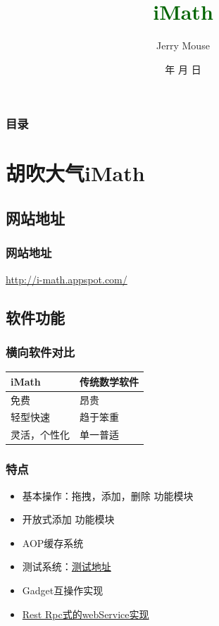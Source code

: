 \documentclass[dvipdfm,serif,mathserif]{beamer}
\renewcommand{\today}{\number\year 年 \number\month 月 \number\day 日}
\begin{document}
\title{   \textcolor{darkgreen}{\textbf{iMath}}}
\date{\today}
\author{Jerry Mouse}

\begin{frame}
\framesubtitle{}
  \titlepage
\end{frame}

\begin{frame}\frametitle{目录}
\tableofcontents

\end{frame}



\section{胡吹大气iMath}

\subsection{网站地址}
\begin{frame}
  \frametitle{网站地址}
\begin{LARGE}\href{http://i-math.appspot.com/}{\color{blue}http://i-math.appspot.com/}
\end{LARGE}\end{frame}

\subsection{软件功能}
\begin{frame}
  \frametitle{横向软件对比}
\begin{center}

\begin{tabular}{m{}m{}}
\toprule
iMath & 传统数学软件 \\
\midrule
\rowcolor{lgray}
免费   & 昂贵 \\
轻型快速   & 趋于笨重   \\
\rowcolor{lgray}
灵活，个性化    & 单一普适   \\
\bottomrule
\end{tabular}

\end{center}
\end{frame}

\begin{frame}
  \frametitle{特点}
\begin{itemize}
\item 基本操作：拖拽，添加，删除 功能模块
\item 开放式添加 功能模块
\item AOP缓存系统
\item 测试系统：\href{http://i-math.appspot.com/ifr.action?url=http://i-math.appspot.com/gadgets/add-gadget/add-gadget.xml}{\color{blue}测试地址}
\item Gadget互操作实现
\item \href{http://i-math.appspot.com/dwr/index.html}{\color{blue}Rest Rpc式的webService实现}
\end{itemize}
\end{frame}
\end{document}
